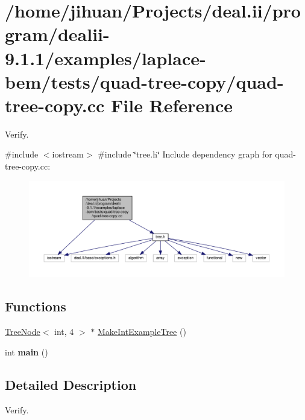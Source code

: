 \hypertarget{quad-tree-copy_8cc}{}\section{/home/jihuan/\+Projects/deal.ii/program/dealii-\/9.1.1/examples/laplace-\/bem/tests/quad-\/tree-\/copy/quad-\/tree-\/copy.cc File Reference}
\label{quad-tree-copy_8cc}


Verify.  


{\ttfamily \#include $<$iostream$>$}\newline
{\ttfamily \#include \char`\"{}tree.\+h\char`\"{}}\newline
Include dependency graph for quad-\/tree-\/copy.cc\+:\nopagebreak
\begin{figure}[H]
\begin{center}
\leavevmode
\includegraphics[width=350pt]{quad-tree-copy_8cc__incl}
\end{center}
\end{figure}
\subsection*{Functions}
\begin{DoxyCompactItemize}
\item 
\hyperlink{classTreeNode}{Tree\+Node}$<$ int, 4 $>$ $\ast$ \hyperlink{quad-tree-copy_8cc_a403caebc7e08d6f14b584539580851d5}{Make\+Int\+Example\+Tree} ()
\item 
\mbox{\label{quad-tree-copy_8cc_ae66f6b31b5ad750f1fe042a706a4e3d4}} 
int {\bfseries main} ()
\end{DoxyCompactItemize}


\subsection{Detailed Description}
Verify. 

